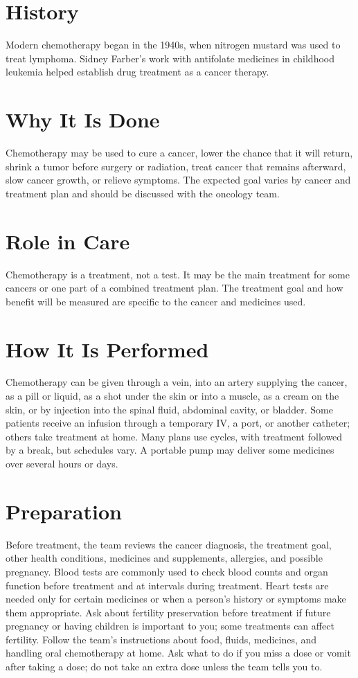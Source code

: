\section*{History}
Modern chemotherapy began in the 1940s, when nitrogen mustard was used to treat lymphoma. Sidney Farber's work with antifolate medicines in childhood leukemia helped establish drug treatment as a cancer therapy.

\section*{Why It Is Done}
Chemotherapy may be used to cure a cancer, lower the chance that it will return, shrink a tumor before surgery or radiation, treat cancer that remains afterward, slow cancer growth, or relieve symptoms. The expected goal varies by cancer and treatment plan and should be discussed with the oncology team.

\section*{Role in Care}
Chemotherapy is a treatment, not a test. It may be the main treatment for some cancers or one part of a combined treatment plan. The treatment goal and how benefit will be measured are specific to the cancer and medicines used.

\section*{How It Is Performed}
Chemotherapy can be given through a vein, into an artery supplying the cancer, as a pill or liquid, as a shot under the skin or into a muscle, as a cream on the skin, or by injection into the spinal fluid, abdominal cavity, or bladder. Some patients receive an infusion through a temporary IV, a port, or another catheter; others take treatment at home. Many plans use cycles, with treatment followed by a break, but schedules vary. A portable pump may deliver some medicines over several hours or days.

\section*{Preparation}
Before treatment, the team reviews the cancer diagnosis, the treatment goal, other health conditions, medicines and supplements, allergies, and possible pregnancy. Blood tests are commonly used to check blood counts and organ function before treatment and at intervals during treatment. Heart tests are needed only for certain medicines or when a person's history or symptoms make them appropriate. Ask about fertility preservation before treatment if future pregnancy or having children is important to you; some treatments can affect fertility. Follow the team's instructions about food, fluids, medicines, and handling oral chemotherapy at home. Ask what to do if you miss a dose or vomit after taking a dose; do not take an extra dose unless the team tells you to.

